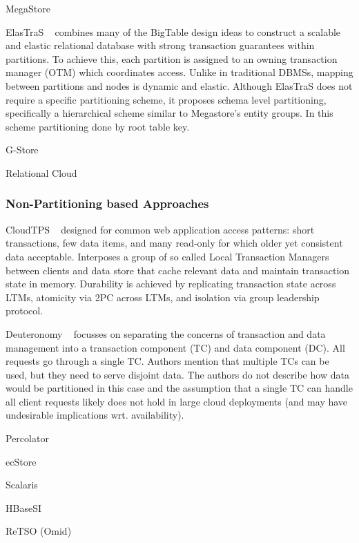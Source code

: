 \documentclass[10pt,final,journal]{IEEEtran}
\begin{document}
MegaStore ~\cite{Furman:2008:8530095, Baker:2011:8530095}

ElasTraS ~\cite{Das:2009:EET:1855533.1855540, Das:2010:EAE} combines many of the BigTable design ideas to construct a scalable and elastic relational database with strong transaction guarantees within partitions. To achieve this, each partition is assigned to an owning transaction manager (OTM) which coordinates access. Unlike in traditional DBMSs, mapping between partitions and nodes is dynamic and elastic. Although ElasTraS does not require a specific partitioning scheme, it proposes schema level partitioning, specifically a hierarchical scheme similar to Megastore's entity groups. In this scheme partitioning done by root table key.

G-Store ~\cite{Das:2010:GSD:1807128.1807157}

Relational Cloud ~\cite{Curino:2011:JPMWMBZ11}

\subsubsection{Non-Partitioning based Approaches}
CloudTPS ~\cite{Zhou:2011:5740834} designed for common web application access patterns: short transactions, few data items, and many read-only for which older yet consistent data acceptable. Interposes a group of so called Local Transaction Managers between clients and data store that cache relevant data and maintain transaction state in memory. Durability is achieved by replicating transaction state across LTMs, atomicity via 2PC across LTMs, and isolation via group leadership protocol.

Deuteronomy ~\cite{Levandoski:2011:8530161} focusses on separating the concerns of transaction and data management into a transaction component (TC) and data component (DC). All requests go through a single TC. Authors mention that multiple TCs can be used, but they need to serve disjoint data. The authors do not describe how data would be partitioned in this case and the assumption that a single TC can handle all client requests likely does not hold in large cloud deployments (and may have undesirable implications wrt. availability).

Percolator ~\cite{Peng:2010:LIP:1924943.1924961}

ecStore ~\cite{}

Scalaris 

HBaseSI

ReTSO (Omid)
\end{document}
